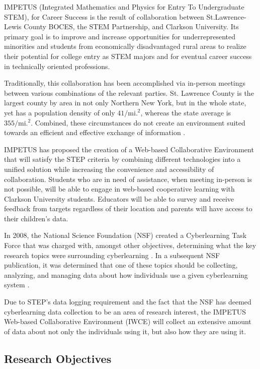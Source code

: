 \documentclass[letterpaper,12pt]{report}
\begin{document}
IMPETUS (Integrated Mathematics and Physics for Entry To Undergraduate STEM), for Career Success is the result of collaboration between St.Lawrence-Lewis County BOCES, the STEM Partnership, and Clarkson University. Its primary goal is to improve and increase opportunities for underrepresented minorities and students from economically disadvantaged rural areas to realize their potential for college entry as STEM majors and for eventual career success in technically oriented professions.

Traditionally, this collaboration has been accomplished via in-person meetings between various combinations of the relevant parties. St. Lawrence County is the largest county by area in not only Northern New York, but in the whole state, yet has a population density of only $41/\mathrm{mi.}^2$, whereas the state average is $355/\mathrm{mi.}^2$. Combined, these circumstances do not create an environment suited towards an efficient and effective exchange of information \cite{nny-prism}.

IMPETUS has proposed the creation of a Web-based Collaborative Environment that will satisfy the STEP criteria by combining different technologies into a unified solution while increasing the convenience and accessibility of collaboration. Students who are in need of assistance, when meeting in-person is not possible, will be able to engage in web-based cooperative learning with Clarkson University students. Educators will be able to survey and receive feedback from targets regardless of their location and parents will have access to their children's data.

In 2008, the National Science Foundation (NSF) created a Cyberlearning Task Force that was charged with, amongst other objectives, determining what the key research topics were surrounding cyberlearning \cite{nsf-taskforce}. In a subsequent NSF publication, it was determined that one of these topics should be collecting, analyzing, and managing data about how individuals use a given cyberlearning system \cite{nsf-cyberlearning}.

Due to STEP's data logging requirement and the fact that the NSF has deemed cyberlearning data collection to be an area of research interest, the IMPETUS Web-based Collaborative Environment (IWCE) will collect an extensive amount of data about not only the individuals using it, but also how they are using it.

\subsection*{Research Objectives}
\end{document}

